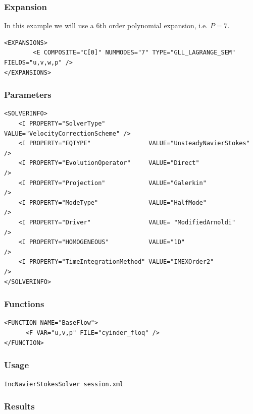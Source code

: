 \subsubsection{Expansion}

In this example we will use a 6th order polynomial expansion, i.e. $P=7$.

 \begin{lstlisting}[style=XMLStyle]
<EXPANSIONS>
        <E COMPOSITE="C[0]" NUMMODES="7" TYPE="GLL_LAGRANGE_SEM" FIELDS="u,v,w,p" />
</EXPANSIONS>
                                            \end{lstlisting}


\subsubsection{Parameters}

 \begin{lstlisting}[style=XMLStyle]
<SOLVERINFO>
    <I PROPERTY="SolverType"            VALUE="VelocityCorrectionScheme" />
    <I PROPERTY="EQTYPE"                VALUE="UnsteadyNavierStokes"     />
    <I PROPERTY="EvolutionOperator"     VALUE="Direct"                   />
    <I PROPERTY="Projection"            VALUE="Galerkin"                 />
    <I PROPERTY="ModeType"              VALUE="HalfMode"                 />
    <I PROPERTY="Driver"                VALUE= "ModifiedArnoldi"         />
    <I PROPERTY="HOMOGENEOUS"           VALUE="1D"                       />
    <I PROPERTY="TimeIntegrationMethod" VALUE="IMEXOrder2"               />
</SOLVERINFO>
                                            \end{lstlisting}


\subsubsection{Functions}

 \begin{lstlisting}[style=XMLStyle]
<FUNCTION NAME="BaseFlow">
      <F VAR="u,v,p" FILE="cyinder_floq" />
</FUNCTION>
                                            \end{lstlisting}


  \subsubsection{Usage}

\texttt{IncNavierStokesSolver session.xml}

\subsubsection{Results}

